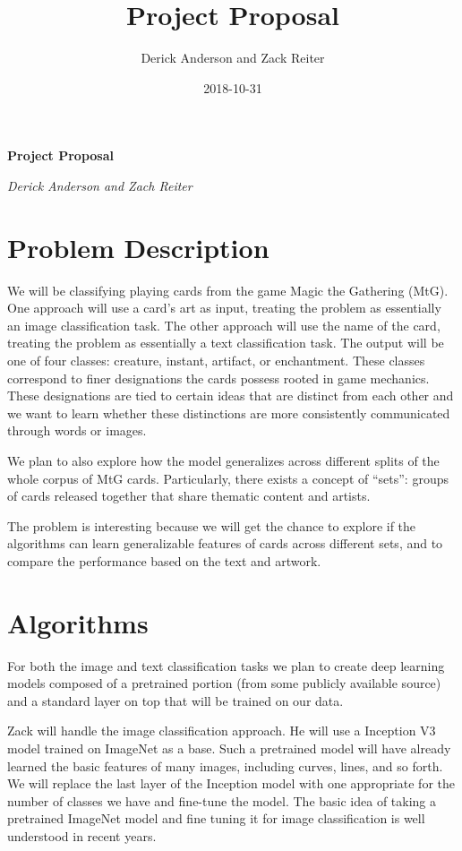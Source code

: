 \documentclass{article}
\title{Project Proposal}
\date{2018-10-31}
\author{Derick Anderson and Zack Reiter}
\begin{document}

\begin{center}
  \textbf{Project Proposal}

  \textit{Derick Anderson and Zach Reiter}
\end{center}

\section*{Problem Description}

We will be classifying playing cards from the game Magic the Gathering (MtG).
One approach will use a card's art as input,
treating the problem
as essentially an image classification task.
The other approach will use the name of the card,
treating the problem
as essentially a text classification task.
The output will be one of four classes:
creature, instant, artifact, or enchantment.
These classes correspond to
finer designations the cards possess
rooted in game mechanics. These designations are
tied to certain ideas that are distinct from each other
and we want to learn whether these distinctions are
more consistently communicated through words or images.

We plan to also explore
how the model generalizes across different splits
of the whole corpus of MtG cards.
Particularly,
there exists a concept of ``sets'':
groups of cards released together that share thematic content and artists.

The problem is interesting because we will get the chance to
explore if the algorithms can learn generalizable features
of cards across different sets,
and to compare the performance based on the text and artwork.

\section*{Algorithms}

For both the image and text classification tasks
we plan to create deep learning models
composed of a pretrained portion
(from some publicly available source)
and a standard layer on top that will be trained on our data.

Zack will handle the image classification approach.
He will use a Inception V3
\cite{rethinking-the-inception-architecture}
model trained on ImageNet as a base.
Such a pretrained model
will have already learned the basic features of many images,
including curves, lines, and so forth.
We will replace the last layer of the Inception model
with one appropriate for the number of classes we have
and fine-tune the model.
The basic idea of taking a pretrained ImageNet model
and fine tuning it for image classification is well understood
in recent years.
\end{document}

